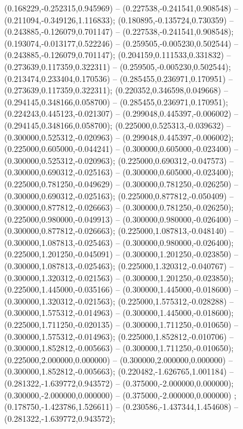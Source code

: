  (0.168229,-0.252315,0.945969) -- (0.227538,-0.241541,0.908548) -- (0.211094,-0.349126,1.116833);
 (0.180895,-0.135724,0.730359) -- (0.243885,-0.126079,0.701147) -- (0.227538,-0.241541,0.908548);
 (0.193074,-0.013177,0.522246) -- (0.259505,-0.005230,0.502544) -- (0.243885,-0.126079,0.701147);
 (0.204159,0.111533,0.331832) -- (0.273639,0.117359,0.322311) -- (0.259505,-0.005230,0.502544);
 (0.213474,0.233404,0.170536) -- (0.285455,0.236971,0.170951) -- (0.273639,0.117359,0.322311);
 (0.220352,0.346598,0.049668) -- (0.294145,0.348166,0.058700) -- (0.285455,0.236971,0.170951);
 (0.224243,0.445123,-0.021307) -- (0.299048,0.445397,-0.006002) -- (0.294145,0.348166,0.058700);
 (0.225000,0.525313,-0.039632) -- (0.300000,0.525312,-0.020963) -- (0.299048,0.445397,-0.006002);
 (0.225000,0.605000,-0.044241) -- (0.300000,0.605000,-0.023400) -- (0.300000,0.525312,-0.020963);
 (0.225000,0.690312,-0.047573) -- (0.300000,0.690312,-0.025163) -- (0.300000,0.605000,-0.023400);
 (0.225000,0.781250,-0.049629) -- (0.300000,0.781250,-0.026250) -- (0.300000,0.690312,-0.025163);
 (0.225000,0.877812,-0.050409) -- (0.300000,0.877812,-0.026663) -- (0.300000,0.781250,-0.026250);
 (0.225000,0.980000,-0.049913) -- (0.300000,0.980000,-0.026400) -- (0.300000,0.877812,-0.026663);
 (0.225000,1.087813,-0.048140) -- (0.300000,1.087813,-0.025463) -- (0.300000,0.980000,-0.026400);
 (0.225000,1.201250,-0.045091) -- (0.300000,1.201250,-0.023850) -- (0.300000,1.087813,-0.025463);
 (0.225000,1.320312,-0.040767) -- (0.300000,1.320312,-0.021563) -- (0.300000,1.201250,-0.023850);
 (0.225000,1.445000,-0.035166) -- (0.300000,1.445000,-0.018600) -- (0.300000,1.320312,-0.021563);
 (0.225000,1.575312,-0.028288) -- (0.300000,1.575312,-0.014963) -- (0.300000,1.445000,-0.018600);
 (0.225000,1.711250,-0.020135) -- (0.300000,1.711250,-0.010650) -- (0.300000,1.575312,-0.014963);
 (0.225000,1.852812,-0.010706) -- (0.300000,1.852812,-0.005663) -- (0.300000,1.711250,-0.010650);
 (0.225000,2.000000,0.000000) -- (0.300000,2.000000,0.000000) -- (0.300000,1.852812,-0.005663);
 (0.220482,-1.626765,1.001184) -- (0.281322,-1.639772,0.943572) -- (0.375000,-2.000000,0.000000);
 (0.300000,-2.000000,0.000000) -- (0.375000,-2.000000,0.000000) ;
 (0.178750,-1.423786,1.526611) -- (0.230586,-1.437344,1.454608) -- (0.281322,-1.639772,0.943572);
